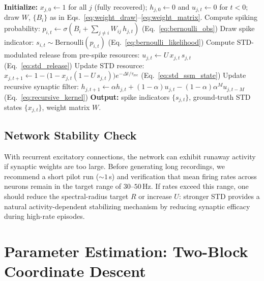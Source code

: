 \documentclass[11pt]{article}
\begin{document}
\begin{algorithm}
\caption{Synthetic network spike train generator}
\label{alg:generator}
\begin{algorithmic}[1]
\STATE \textbf{Initialize:} $x_{j,0} \leftarrow 1$ for all $j$ (fully recovered);
       $h_{j,0} \leftarrow 0$ and $u_{j,t}\leftarrow0$ for $t<0$; draw $W$, $\{B_i\}$ as in
       Eqs.~\eqref{eq:weight_draw}--\eqref{eq:weight_matrix}.
    \STATE Compute spiking probability:
           $p_{i,t} \leftarrow \sigma\!\left(B_i +
           \sum_{j \neq i} W_{ij}\,h_{j,t}\right)$
           \hfill(Eq.~\ref{eq:bernoulli_obs})
    \STATE Draw spike indicator:
           $s_{i,t} \sim \mathrm{Bernoulli}(p_{i,t})$
           \hfill(Eq.~\ref{eq:bernoulli_likelihood})
  \ENDFOR
    \STATE Compute STD-modulated release from pre-spike resources:
           $u_{j,t} \leftarrow U\,x_{j,t}\,s_{j,t}$
           \hfill(Eq.~\ref{eq:std_release})
    \STATE Update STD resource:
           $x_{j,t+1} \leftarrow
           1-\big(1-x_{j,t}(1-U\,s_{j,t})\big)e^{-\Delta t/\tau_{\mathrm{rec}}}$
           \hfill(Eq.~\ref{eq:std_ssm_state})
    \STATE Update recursive synaptic filter:
           $h_{j,t+1} \leftarrow
           \alpha h_{j,t} + (1-\alpha)u_{j,t}
           -(1-\alpha)\alpha^M u_{j,t-M}$
           \hfill(Eq.~\ref{eq:recursive_kernel})
  \ENDFOR
\ENDFOR
\STATE \textbf{Output:} spike indicators $\{s_{j,t}\}$, ground-truth STD states
       $\{x_{j,t}\}$, weight matrix $W$.
\end{algorithmic}
\end{algorithm}

\subsection{Network Stability Check}
\label{sec:gen_stability}

With recurrent excitatory connections, the network can exhibit runaway activity
if synaptic weights are too large. Before generating long recordings, we recommend
a short pilot run ($\sim 1$\,s) and verification that mean firing rates across
neurons remain in the target range of $30$--$50$\,Hz. If rates exceed this
range, one should reduce the spectral-radius target $R$ or increase $U$: stronger
STD provides a natural activity-dependent stabilizing mechanism by reducing
synaptic efficacy during high-rate episodes.

\section{Parameter Estimation: Two-Block Coordinate Descent}
\label{sec:param_estimation}
\end{document}
